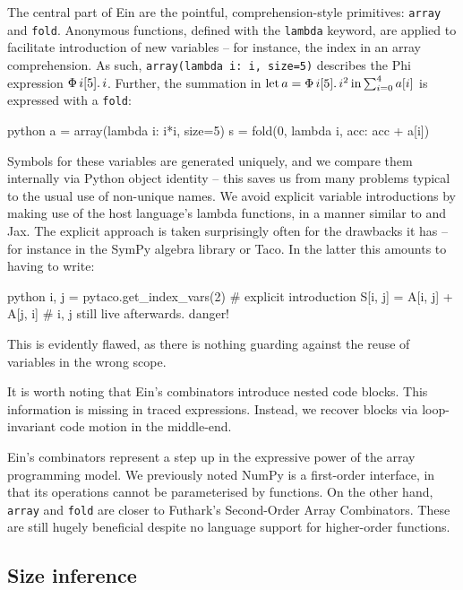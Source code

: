 The central part of Ein are the pointful, comprehension-style primitives: \texttt{array} and \texttt{fold}. Anonymous functions, defined with the \texttt{lambda} keyword, are applied to facilitate introduction of new variables -- for instance, the index in an array comprehension. As such, \texttt{array(lambda i: i, size=5)} describes the Phi expression $\Phi\, {i}[{5}] \ldotp {i}$. Further, the summation in $\mathrm{let}\,{a}={\Phi\, {i}[{5}] \ldotp {i^2}}\,\mathrm{in}\,{ \sum_{i=0}^{4} a[i]}$ is expressed with a \texttt{fold}:
\begin{center}
\begin{cminted}{python}
a = array(lambda i: i*i, size=5)
s = fold(0, lambda i, acc: acc + a[i])
\end{cminted}
\end{center}
Symbols for these variables are generated uniquely, and we compare them internally via Python object identity -- this saves us from many problems typical to the usual use of non-unique names. We avoid explicit variable introductions by making use of the host language's lambda functions, in a manner similar to \textcite{atkey2009unembedding} and Jax. The explicit approach is taken surprisingly often for the drawbacks it has -- for instance in the SymPy algebra library or Taco. In the latter this amounts to having to write:
\begin{center}
\begin{cminted}{python}
i, j = pytaco.get_index_vars(2)  # explicit introduction
S[i, j] = A[i, j] + A[j, i]      # i, j still live afterwards. danger!
\end{cminted}
\end{center}
This is evidently flawed, as there is nothing guarding against the reuse of variables in the wrong scope. 

It is worth noting that Ein's combinators introduce nested code blocks. This information is missing in traced expressions. Instead, we recover blocks via loop-invariant code motion in the middle-end.

Ein's combinators represent a step up in the expressive power of the array programming model. We previously noted NumPy is a first-order interface, in that its operations cannot be parameterised by functions. On the other hand, \texttt{array} and \texttt{fold} are closer to Futhark's Second-Order Array Combinators. These are still hugely beneficial despite no language support for higher-order functions.

\subsection{Size inference}

